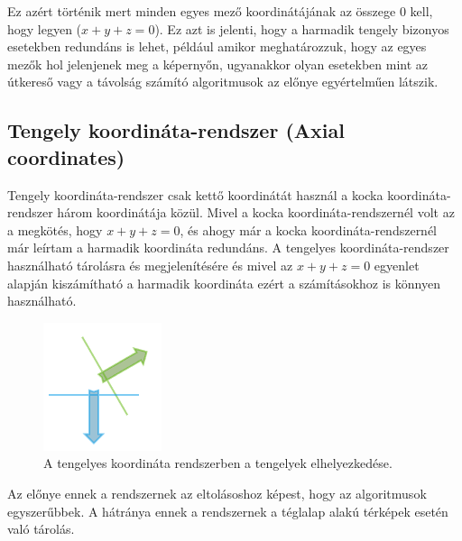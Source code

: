 \noindent Ez azért történik mert minden egyes mező koordinátájának az összege $0$ kell, hogy legyen ($x + y + z = 0$). Ez azt is jelenti, hogy a harmadik tengely bizonyos esetekben redundáns is lehet, például amikor meghatározzuk, hogy az egyes mezők hol jelenjenek meg a képernyőn, ugyanakkor olyan esetekben mint az útkereső vagy a távolság számító algoritmusok az előnye egyértelműen látszik. 

\subsection{Tengely koordináta-rendszer (Axial coordinates)}

Tengely koordináta-rendszer csak kettő koordinátát használ a kocka koordináta-rendszer három koordinátája közül. Mivel a kocka koordináta-rendszernél volt az a megkötés, hogy $x + y + z = 0$, és ahogy már a kocka koordináta-rendszernél már leírtam a harmadik koordináta redundáns.  A tengelyes koordináta-rendszer használható tárolásra és megjelenítésére és mivel az $x + y + z = 0$ egyenlet alapján kiszámítható a harmadik koordináta ezért a számításokhoz is könnyen használható.

\begin{figure}[h]
\centering
\includegraphics[scale=0.5]{kepek/img46.png}
\caption{A tengelyes koordináta rendszerben a tengelyek elhelyezkedése.}
\label{fig:img46}
\end{figure}

\noindent Az előnye ennek a rendszernek az eltolásoshoz képest, hogy az algoritmusok egyszerűbbek. A hátránya ennek a rendszernek a téglalap alakú térképek esetén való tárolás. 
